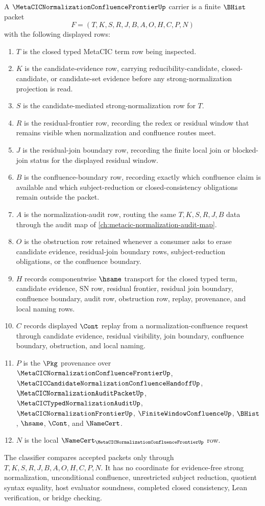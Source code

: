 \begin{definition}
\label{def:metacic-normalization-confluence-frontier-carrier}
A $\MetaCICNormalizationConfluenceFrontierUp$ carrier is a finite $\BHist$ packet
$$
F=(T,K,S,R,J,B,A,O,H,C,P,N)
$$
with the following displayed rows:
\begin{enumerate}
\item $T$ is the closed typed MetaCIC term row being inspected.
\item $K$ is the candidate-evidence row, carrying reducibility-candidate, closed-candidate, or candidate-set evidence before any strong-normalization projection is read.
\item $S$ is the candidate-mediated strong-normalization row for $T$.
\item $R$ is the residual-frontier row, recording the redex or residual window that remains visible when normalization and confluence routes meet.
\item $J$ is the residual-join boundary row, recording the finite local join or blocked-join status for the displayed residual window.
\item $B$ is the confluence-boundary row, recording exactly which confluence claim is available and which subject-reduction or closed-consistency obligations remain outside the packet.
\item $A$ is the normalization-audit row, routing the same $T,K,S,R,J,B$ data through the audit map of \autoref{ch:metacic-normalization-audit-map}.
\item $O$ is the obstruction row retained whenever a consumer asks to erase candidate evidence, residual-join boundary rows, subject-reduction obligations, or the confluence boundary.
\item $H$ records componentwise $\hsame$ transport for the closed typed term, candidate evidence, SN row, residual frontier, residual join boundary, confluence boundary, audit row, obstruction row, replay, provenance, and local naming rows.
\item $C$ records displayed $\Cont$ replay from a normalization-confluence request through candidate evidence, residual visibility, join boundary, confluence boundary, obstruction, and local naming.
\item $P$ is the $\Pkg$ provenance over $\MetaCICNormalizationConfluenceFrontierUp$, $\MetaCICCandidateNormalizationConfluenceHandoffUp$, $\MetaCICNormalizationAuditPacketUp$, $\MetaCICTypedNormalizationAuditUp$, $\MetaCICNormalizationFrontierUp$, $\FiniteWindowConfluenceUp$, $\BHist$, $\hsame$, $\Cont$, and $\NameCert$.
\item $N$ is the local $\NameCert_{\MetaCICNormalizationConfluenceFrontierUp}$ row.
\end{enumerate}
The classifier compares accepted packets only through $T,K,S,R,J,B,A,O,H,C,P,N$. It has no coordinate for evidence-free strong normalization, unconditional confluence, unrestricted subject reduction, quotient syntax equality, host evaluator soundness, completed closed consistency, Lean verification, or bridge checking.
\end{definition}

